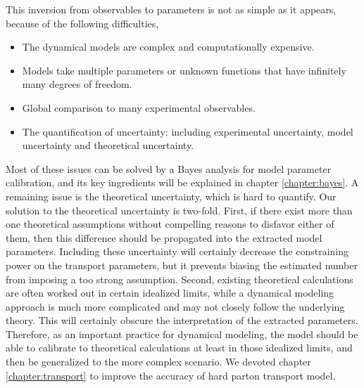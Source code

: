 This inversion from observables to parameters is not as simple as it appears, because of the following difficulties,
\begin{itemize}
\item The dynamical models are complex and computationally expensive.
\item Models take multiple parameters or unknown functions that have infinitely many degrees of freedom.
\item Global comparison to many experimental observables.
\item The quantification of uncertainty: including experimental uncertainty, model uncertainty and theoretical uncertainty.
\end{itemize}
Most of these issues can be solved by a Bayes analysis for model parameter calibration, and its key ingredients will be explained in chapter \ref{chapter:bayes}.
A remaining issue is the theoretical uncertainty, which is hard to quantify.
Our solution to the theoretical uncertainty is two-fold.
First, if there exist more than one theoretical assumptions without compelling reasons to disfavor either of them, then this difference should be propagated into the extracted model parameters.
Including these uncertainty will certainly decrease the constraining power on the transport parameters, but it prevents biasing the estimated number from imposing a too strong assumption.
Second, existing theoretical calculations are often worked out in certain idealized limits, while a dynamical modeling approach is much more complicated and may not closely follow the underlying theory.
This will certainly obscure the interpretation of the extracted parameters.
Therefore, as an important practice for dynamical modeling, the model should be able to calibrate to theoretical calculations at least in those idealized limits, and then be generalized to the more complex scenario.
We devoted chapter \ref{chapter:transport} to improve the accuracy of hard parton transport model.

